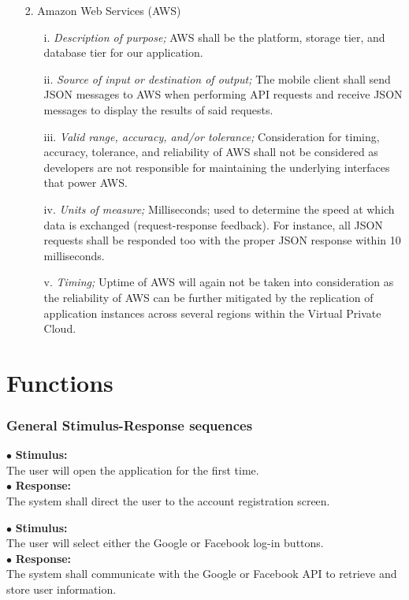 \documentclass{scrreprt}
\begin{document}
\begin{enumerate}
	\item[2.] Amazon Web Services (AWS)
	\begin{itemize}
		\item[i.] \textit{Description of purpose;} AWS shall be the platform, storage tier, and database tier for our application. 
		\item[ii.] \textit{Source of input or destination of output;} The mobile client shall send JSON messages to AWS when performing API requests and receive JSON messages to display the results of said requests.
		\item[iii.] \textit{Valid range, accuracy, and/or tolerance;} Consideration for timing, accuracy, tolerance, and reliability of AWS shall not be considered as developers are not responsible for maintaining the underlying interfaces that power AWS.
		\item[iv.]  \textit{Units of measure;} Milliseconds; used to determine the speed at which data is exchanged (request-response feedback). For instance, all JSON requests shall be responded too with the proper JSON response within 10 milliseconds.
		\item[v.] \textit{Timing;} Uptime of AWS will again not be taken into consideration as the reliability of AWS can be further mitigated by the replication of application instances across several regions within the Virtual Private Cloud.
	\end{itemize}
\end{enumerate}
\section{Functions}


\subsubsection{General Stimulus-Response sequences}
\vspace{5mm}
	$\bullet$ \textbf{Stimulus:} \\ \hspace{5mm} The user will open the application for the first time.\\
	$\bullet$ \textbf{Response:} \\ \hspace{5mm} The system shall direct the user to the account registration screen.

\vspace{5mm}
	\hspace{-4.75mm} $\bullet$ \textbf{Stimulus:} \\ \hspace{5mm} The user will select either the Google or Facebook log-in buttons.\\
	$\bullet$ \textbf{Response:} \\ \hspace{5mm} The system shall communicate with the Google or Facebook API to retrieve and store user information.
\end{document}
